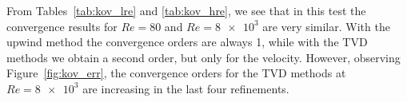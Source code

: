 From Tables~\ref{tab:kov_lre} and \ref{tab:kov_hre}, we see that in this test 
the convergence results for $Re=80$ and $Re=\num{8e3}$ are very similar. With 
the upwind method the convergence orders are always 1, while with the TVD 
methods we obtain a second order, but only for the velocity. However, observing 
Figure~\ref{fig:kov_err}, the convergence orders for the TVD methods at 
$Re=\num{8e3}$ are increasing in the last four refinements.
%
